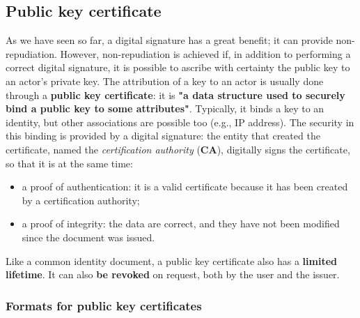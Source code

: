 \subsection{Public key certificate}\label{chap:public-key-certificate}
As we have seen so far, a digital signature has a great benefit; it can provide non-repudiation.
However, non-repudiation is achieved if, in addition to performing a correct digital signature, it is possible to ascribe with certainty the public key to an actor's private key.
The attribution of a key to an actor is usually done through a \textbf{public key certificate}: it is \textbf{"a data structure used to securely bind a public key to some attributes"}.
Typically, it binds a key to an identity, but other associations are possible too (e.g., IP address).
The security in this binding is provided by a digital signature: the entity that created the certificate, named the \textit{certification authority} (\textbf{CA}), digitally signs the certificate, so that it is at the same time:
\begin{itemize}
	\item a proof of authentication: it is a valid certificate because it has been created by a certification authority;
	\item a proof of integrity: the data are correct, and they have not been modified since the document was issued.
\end{itemize}

Like a common identity document, a public key certificate also has a \textbf{limited lifetime}. It can also \textbf{be
	revoked} on request, both by the user and the issuer.


\subsubsection{Formats for public key certificates}

